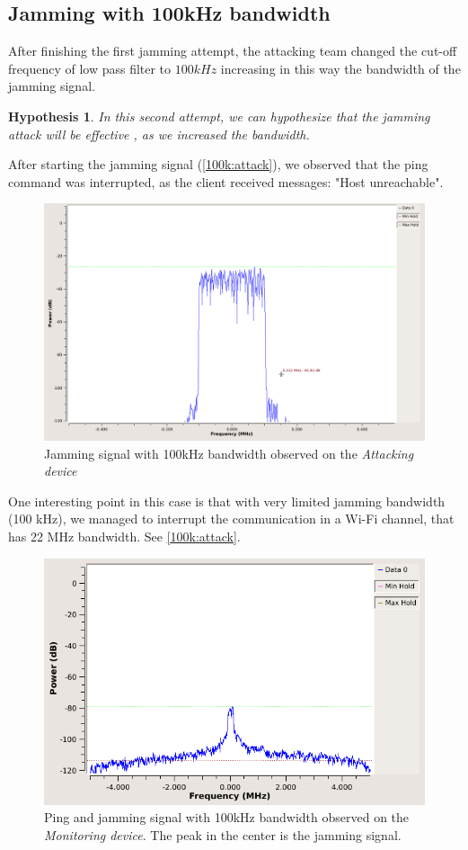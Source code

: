 \documentclass[12pt,a4paper]{article}
\newtheorem{hypo}{Hypothesis}
\begin{document}
\subsection{Jamming with 100kHz bandwidth}
	After finishing the first jamming attempt, the attacking team changed the cut-off frequency of low pass filter to $100kHz$ increasing in this way the bandwidth of the jamming signal.
	\begin{hypo}
		In this second attempt, we can hypothesize that the jamming attack will be effective , as we increased the bandwidth.
	\end{hypo} 

	After starting the jamming signal (\autoref{100k:attack}), we observed that the ping command was interrupted, as the client received messages: "Host unreachable".
	\begin{figure}
		\includegraphics[width=\textwidth]{images/attack_100kHz.png}
		\caption{Jamming signal with 100kHz bandwidth observed on the \emph{Attacking device}}
		\label{100k:attack}
	\end{figure}
	
	One interesting point in this case is that with very limited jamming bandwidth (100 kHz), we managed to interrupt the communication in a Wi-Fi channel, that has 22 MHz bandwidth. See \autoref{100k:attack}.
	
	\begin{figure}
		\includegraphics[width=\textwidth]{images/mon_100k.png}
		\caption{Ping and jamming signal with 100kHz bandwidth observed on the \emph{Monitoring device}. The peak in the center is the jamming signal.}
		\label{100k:attack}
	\end{figure}
	
\end{document}
